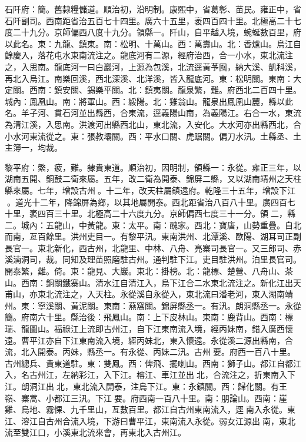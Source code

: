 \begin{pinyinscope}
石阡府：簡。舊隸糧儲道。順治初，沿明制。康熙中，省葛彰、苗民。雍正中，省石阡副司。西南距省治五百七十四里。廣六十五里，袤四百四十里。北極高二十七度二十九分。京師偏西八度十九分。領縣一。阡山，自平越入境，蜿蜒數百里，府以此名。東：九龍、鎮東。南：松明、十萬山。西：萬壽山。北：香爐山。烏江自餘慶入，落花屯水東南流注之。龍底河有二源，經府治西，合一小水，東北流注之，入思南。龍底河一曰白巖河，上源為包溪，北流逕黃芧囤，納大溪、凱科溪，再北入烏江。南樂回溪，西北深溪、北洋溪，皆入龍底河。東：松明關。東南：大定關。西南：鎮安關、錫樂平關。北：鎮夷關。龍泉繁，難。府西北二百四十里。城內：鳳凰山。南：將軍山。西：綏陽。北：雞翁山。龍泉出鳳凰山麓，縣以此名。羊子河、貫石河並出縣西，合東流，逕義陽山南，為義陽江。右合一水，東流為清江溪，入思南。洪渡河出縣西北山，東北流，入安化。大水河亦出縣西北，合小水河東流從之。東：張教壩關。西：平水口關、虎踞關。偏刀水汛。土縣丞、土主簿一，均裁。

黎平府：繁，疲，難。隸貴東道。順治初，因明制，領縣一：永從。雍正三年，以湖南五開、銅鼓二衛來屬。五年，改二衛為開泰、錦屏二縣，又以湖南靖州之天柱縣來屬。七年，增設古州。十二年，改天柱屬鎮遠府。乾隆三十五年，增設下江。道光十二年，降錦屏為鄉，以其地屬開泰。西北距省治八百八十里。廣四百七十里，袤四百三十里。北極高二十六度九分。京師偏西七度三十一分。領二，縣二。城內：五龍山，中黃龍。東：太平。南：醜家。西北：寶唐，山勢重疊。自北而南，亙百餘里。洪州吏目一。有黎平汛。東南洪州、北潭溪、歐陽、湖耳司正副長官一。東北新化，西古州，北龍里、中林、八舟、亮寨司長官一。又三郎司、赤溪湳洞司，裁。同知及理苗照磨駐古州。通判駐下江。吏目駐洪州。泊里長官司。開泰繁，難。倚。東：龍見、大巖。東北：掛榜。北：龍標、楚營、八舟山、茶山。西南：銅關鐵寨山。清水江自清江入，烏下江合二水東北流注之。新化江出天甫山，亦東北流注之，入天柱。永從溪自永從入，東北流曰潘老河，東入湖南靖州。東：寧溪關、黃泥關。東南：燕窩關。錦屏縣丞一。有汛。朗洞縣丞一。永從簡。府南六十里。縣治後：飛鳳山。南：上下皮林山。東南：鹿背山。西南：標瑞、龍圖山。福祿江上流即古州江，自下江東南流入境，經丙妹南，錯入廣西懷遠。曹平江亦自下江東南流入境，經丙妹北，東入懷遠。永從溪二源出縣南，合流，北入開泰。丙妹，縣丞一。有永從、丙妹二汛。古州要。府西一百八十里。古州總兵、貴東道駐。東：雙鳳。西：俾飛、擺喇山。西南：獅子山。都江自都江入，名古州江，左納彩江，入下江。榕江、車江並出北，合流注之，折東南入下江。朗洞江出北，東北流入開泰，注烏下江。東：永鎮關。西：歸化關。有王嶺、寨蒿、小都江三汛。下江要。府西南一百八十里。南：朋論山。西南：崖雞、烏地、霧惈、九千里山，亙數百里。都江自古州東南流入，逕南入永從。東江、溶江自古州合流入境，下游曰曹平江，東南流入永從。弱女江源出南，東北流至雙江口，小溪東北流來會，再東北入古州江。


\end{pinyinscope}
